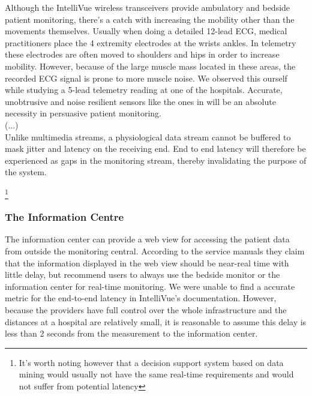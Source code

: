 Although the IntelliVue wireless transceivers provide ambulatory and bedside patient monitoring, there's a catch with increasing the mobility other than the movements themselves. Usually when doing a detailed 12-lead ECG, medical practitioners place the 4 extremity electrodes at the wrists ankles. In telemetry these electrodes are often moved to shoulders and hips in order to increase mobility. However, because of the large muscle mass located in these areas, the recorded ECG signal is prone to more muscle noise. We observed this ourself while studying a 5-lead telemetry reading at one of the hospitals. Accurate, unobtrusive and noise resilient sensors like the ones in \cite{ChulsungPark:2006tf, Anonymous:FtVb5yQr} will be an absolute necessity in persuasive patient monitoring. 
\\
\newline
(...)
\\
\newline
Unlike multimedia streams, a physiological data stream cannot be buffered to mask jitter and latency on the receiving end. End to end latency will therefore be experienced as gaps in the monitoring stream, thereby invalidating the purpose of the system.


\footnote{It's worth noting however that a decision support system based on data mining would usually not have the same real-time requirements and would not suffer from potential latency}


\subsubsection{The Information Centre} %
\label{ssub:the_information_centre}

The information center can provide a web view for accessing the patient data from outside the monitoring central. According to the service manuals they claim that the information displayed in the web view should be near-real time with little delay, but recommend users to always use the bedside monitor or the information center for real-time monitoring. We were unable to find a accurate metric for the end-to-end latency in IntelliVue's documentation. However, because the providers have full control over the whole infrastructure and the distances at a hospital are relatively small, it is reasonable to assume this delay is less than 2 seconds from the measurement to the information center.


